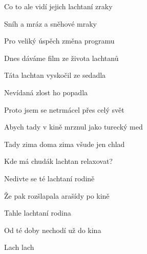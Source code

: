 \begin{song}
\bigskip

Co to ale vidí jejich lachtaní zraky \par
{}Sníh a mráz a sněhové mraky \par
{}Pro veliký úspěch změna programu \par
Dnes dáváme film ze života lachtanů \par

\bigskip

\Refren

\bigskip

Táta lachtan vyskočil ze sedadla \par
{}Nevídaná zlost ho popadla \par
{}Proto jsem se netrmácel přes celý svět \par
Abych tady v kině mrznul jako turecký med \par

\bigskip

Tady zima doma zima všude jen chlad \par
{}Kde má chudák lachtan relaxovat? \par
{}Nedivte se té lachtaní rodině \par
Že pak rozšlapala arašídy po kině \par

\bigskip

\Refren

\bigskip

Tahle lachtaní rodina \par
{}Od té doby nechodí už do kina \par
Lach lach \par

\end{song}
